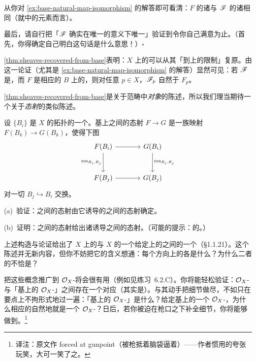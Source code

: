 从你对 \cref{ex:base-natural-map-isomorphism} 的解答即可看清：$F$ 的诸\trRestrictionMap{}与 $\mathscr{F}$ 的诸\trRestrictionMap{}相同（就\trBase{}中的元素而言）。

最后，请自行把「$\mathscr{F}$ 确实在唯一的\trIsomorphism{}意义下唯一」验证到令你自己满意为止。（首先，你得确定自己明白这句话是什么意思！）\hfill$\square$

\cref{thm:sheaves-recovered-from-base}表明：$X$ 上的\trSheaf{}可以从其「到\trBase{}上的限制」复原。由这一论证（尤其是 \cref{ex:base-natural-map-isomorphism} 的解答）显然可见：若 $\mathscr{F}$ 是\trSheaf，而 $F$ 是相应的\trBase{} $B$ 上的\trSheaf，则对任意 $p\in X$，$\mathscr{F}_p$ 自然\trIsomorphic{}于 $F_p$。

\cref{thm:sheaves-recovered-from-base}是关于范畴中\emph{对象}的陈述，所以我们理当期待一个关于\emph{态射}的类似陈述。

\begin{exercise}\label{ex:sheaf-morphisms-on-base}
设 $\{B_i\}$ 是 $X$ 的拓扑的一个\trBase。基上\trSheaf{}之间的态射 $F\to G$ 是一族映射 $F(B_k)\to G(B_k)$，使得下图
\[
\begin{tikzcd}[row sep=2.8em, column sep=3.6em]
F(B_i) \ar[r] \ar[d, "\mathrm{res}_{B_i,B_j}"'] & G(B_i) \ar[d, "\mathrm{res}_{B_i,B_j}"] \\
F(B_j) \ar[r] & G(B_j)
\end{tikzcd}
\]
对一切 $B_j\hookrightarrow B_i$ 交换。

(a)~验证：\trSheaf{}之间的态射由它诱导的\trSheafOnBase{}之间的态射确定。

(b)~证明：\trSheafOnBase{}之间的态射给出诸诱导\trSheaf{}之间的态射。（可能的提示：\trCompatible{}的\trStalk。）
\end{exercise}

\begin{remark}\label{thm:base-equivalence-of-categories}
上述构造与论证给出了 $X$ 上的\trSheaf{}与 $X$ 的一个给定\trBase{}上的\trSheaf{}之间的一个\trEquivalenceOfCategories（\S1.1.21）。这个陈述并无新内容，但你不妨把它的含义想通：每个方向上的\trFunctor{}各是什么？为什么二者的\trComposition{}不恰是\trIdFunctor？
\end{remark}

\begin{remark}\label{thm:ox-modules-on-base}
把这些概念推广到 $\mathcal{O}_X$-\trModule{}将会很有用（例如见\mbox{练习~6.2.C}）。你将能轻松验证：$\mathcal{O}_X$-\trModule{}与「基上的 $\mathcal{O}_X$-\trModule」之间存在一个对应（其实是\trEquivalenceOfCategories）。与其动手把细节做尽，不如只在要点上不拘形式地过一遍：「基上的 $\mathcal{O}_X$-\trModule」是什么？给定基上的一个 $\mathcal{O}_X$-\trModule，为什么相应的\trSheaf{}自然地就是一个 $\mathcal{O}_X$-\trModule？日后，若你被迫在枪口之下补全细节，你将能够做到。\footnote{译注：原文作 forced at gunpoint（被枪抵着脑袋逼着）——作者惯用的夸张玩笑，大可一笑了之。}
\end{remark}


